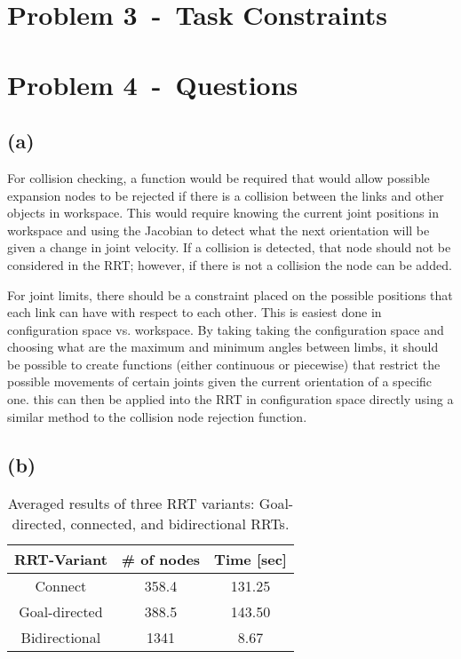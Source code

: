 \documentclass[12pt]{article}
\newcommand{\problem}[2]{\section*{Problem {#1}~-~{#2}}}
\newcommand{\problemPart}[1]{\subsection*{(#1)}}
\begin{document}
\problem{3}{Task Constraints}
\label{sec:problem_3}

\problem{4}{Questions}
\label{sec:problem_4}
\problemPart{a}
For collision checking, a function would be required that would allow possible expansion nodes to be rejected if there is a collision between the links and other objects in workspace. This would require knowing the current joint positions in workspace and using the Jacobian to detect what the next orientation will be given a change in joint velocity. If a collision is detected, that node should not be considered in the RRT; however, if there is not a collision the node can be added.

For joint limits, there should be a constraint placed on the possible positions that each link can have with respect to each other. This is easiest done in configuration space vs. workspace. By taking taking the configuration space and choosing what are the maximum and minimum angles between limbs, it should be possible to create functions (either continuous or piecewise) that restrict the possible movements of certain joints given the current orientation of a specific one. this can then be applied into the RRT in configuration space directly using a similar method to the collision node rejection function.

\problemPart{b}
\begin{table}%
\centering
\label{table:results}
\caption{Averaged results of three RRT variants: Goal-directed, connected, and bidirectional RRTs.}
\begin{tabular*}{0.5\textwidth}{c|c|c}
\hline
\bfseries RRT-Variant & \bfseries \# of nodes & \bfseries Time [sec] \\
\hline\hline
Connect 	&  358.4 	& 131.25 	\\ \hline\hline
Goal-directed 	&  388.5 	& 143.50 	\\ \hline\hline
Bidirectional 	&  1341 	& 8.67 		\\ \hline\hline
\hline
\end{tabular*}
\end{table}
\end{document}
